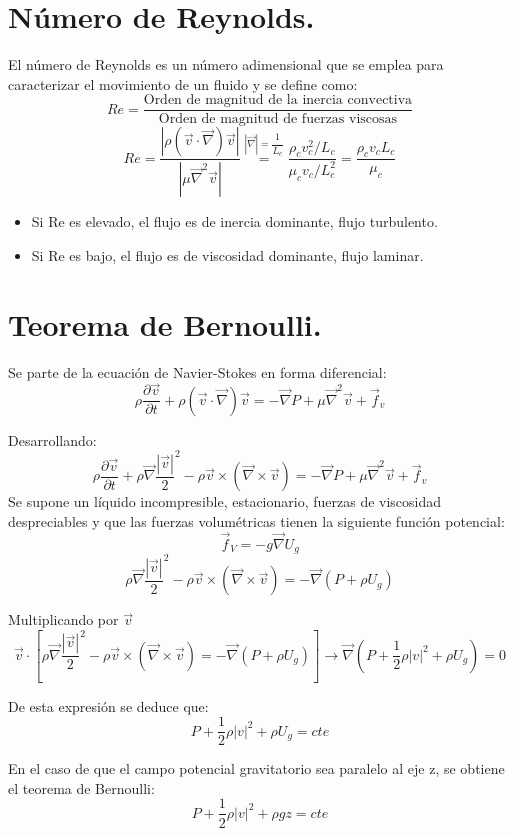 \section{Número de Reynolds.}
El número de Reynolds es un número adimensional que se emplea para caracterizar el movimiento de un fluido y se define como:
\[Re=\dfrac{\text{Orden de magnitud de la inercia convectiva}}{\text{Orden de magnitud de fuerzas viscosas}}\]
\[Re=\dfrac{|\rho\left(\vec{v}\cdot\vec{\nabla}\right)\vec{v}|}{|\mu\vec{\nabla}^2\vec{v}|}
\stackrel{|\vec{\nabla}|=\dfrac{1}{L_c}}{=}\dfrac{\rho_c v^2_c/L_c}{\mu_c v_c/L^2_c}=\dfrac{\rho_c v_c L_c}{\mu_c}\]
\begin{itemize}
	\item Si Re es elevado, el flujo es de inercia dominante, flujo turbulento.
	\item Si Re es bajo, el flujo es de viscosidad dominante, flujo laminar.
\end{itemize}
\section{Teorema de Bernoulli.}
Se parte de la ecuación de Navier-Stokes en forma diferencial:
\[\rho\dfrac{\partial \vec{v}}{\partial t}+\rho\left(\vec{v}\cdot\vec{\nabla}\right)\vec{v}=-\vec{\nabla}P+\mu\vec{\nabla}^2\vec{v}+ \vec{f}_v\]

Desarrollando:
\[\rho\dfrac{\partial \vec{v}}{\partial t}
+
\rho\vec{\nabla}\dfrac{|\vec{v}|}{2}^2-\rho\vec{v} \times \left(\vec{\nabla}\times\vec{v}\right)
=-\vec{\nabla}P+\mu\vec{\nabla}^2\vec{v}+\vec{f}_v
\]
\newpage
Se supone un líquido incompresible, estacionario, fuerzas de viscosidad despreciables y que las fuerzas volumétricas tienen la siguiente función potencial:
\[\vec{f}_V=-g\vec{\nabla}U_g\]
\[\rho\vec{\nabla}\dfrac{|\vec{v}|}{2}^2
-
\rho\vec{v} \times \left(\vec{\nabla}\times\vec{v}\right)
=
-\vec{\nabla}\left(P+\rho U_g\right)\]

Multiplicando por $\vec{v}$
\[\vec{v}\cdot\left[\rho\vec{\nabla}\dfrac{|\vec{v}|}{2}^2
-
\rho\vec{v} \times \left(\vec{\nabla}\times\vec{v}\right)
=
-\vec{\nabla}\left(P+\rho U_g\right)\right]\rightarrow\vec{\nabla}\left(P+\dfrac{1}{2}\rho|v|^2+\rho U_g\right)=0\]

De esta expresión se deduce que:
\[P+\dfrac{1}{2}\rho|v|^2+\rho U_g=cte\]

En el caso de que el campo potencial gravitatorio sea paralelo al eje z, se obtiene el teorema de Bernoulli:
\[P+\dfrac{1}{2}\rho|v|^2+\rho gz=cte\]